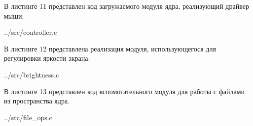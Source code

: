 В листинге 11 представлен код загружаемого модуля ядра, реализующий драйвер мыши.

\FloatBarrier
\begin{lstinputlisting}[language=C, caption=Загружаемый модуль ядра реализующий драйвер мыши, linerange = {},
	basicstyle=\footnotesize\ttfamily, frame=single, breaklines=true]{../src/controller.c}
\end{lstinputlisting}
\FloatBarrier

\clearpage

В листинге 12 представлена реализация модуля, использующегося для регулировки яркости экрана.

\FloatBarrier
\begin{lstinputlisting}[language=C, caption=Реализация функции probe, linerange = {},
	basicstyle=\footnotesize\ttfamily, frame=single, breaklines=true]{../src/brightness.c}
\end{lstinputlisting}
\FloatBarrier

\clearpage

В листинге 13 представлен код вспомогательного модуля для работы с файлами из пространства ядра.

\FloatBarrier
\begin{lstinputlisting}[language=C, caption=Вспомогательный модуль для работы с файлами из пространства ядра, linerange = {},
	basicstyle=\footnotesize\ttfamily, frame=single, breaklines=true]{../src/file\_ops.c}
\end{lstinputlisting}
\FloatBarrier